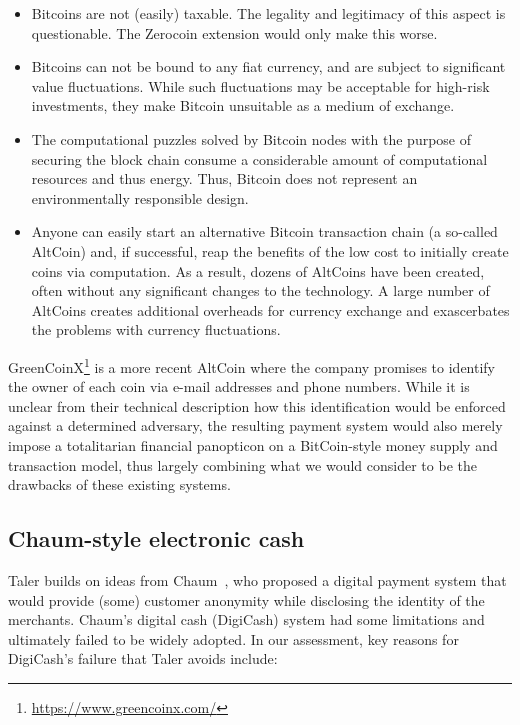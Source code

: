 \documentclass{llncs}
\begin{document}
\begin{itemize}
  \item Bitcoins are not (easily) taxable.  The legality and legitimacy of
    this aspect is questionable.  The Zerocoin extension would only make
    this worse.
  \item Bitcoins can not be bound to any fiat currency, and are subject to
    significant value fluctuations.  While such fluctuations may be
    acceptable for high-risk investments, they make Bitcoin unsuitable as
    a medium of exchange.
  \item The computational puzzles solved by Bitcoin nodes with the purpose
    of securing the block chain
    consume a considerable amount of computational resources and thus
    energy.  Thus, Bitcoin does not represent an environmentally responsible
    design.
  \item Anyone can easily start an alternative Bitcoin transaction chain
    (a so-called AltCoin) and, if successful, reap the benefits of the low
    cost to initially create coins via computation.  As a result, dozens of
    AltCoins have been created, often without any significant changes to the
    technology.  A large number of AltCoins creates additional overheads for
    currency exchange and exascerbates the problems with currency fluctuations.
\end{itemize}

GreenCoinX\footnote{\url{https://www.greencoinx.com/}} is a more
recent AltCoin where the company promises to identify the owner of
each coin via e-mail addresses and phone numbers.  While it is unclear
from their technical description how this identification would be
enforced against a determined adversary, the resulting payment system
would also merely impose a totalitarian financial panopticon on a
BitCoin-style money supply and transaction model, thus largely
combining what we would consider to be the drawbacks of these existing
systems.

\subsection{Chaum-style electronic cash}

Taler builds on ideas from Chaum~\cite{chaum1983blind}, who proposed a
digital payment system that would provide (some) customer anonymity
while disclosing the identity of the merchants.  Chaum's digital cash
(DigiCash) system had some limitations and ultimately failed to be widely
adopted.  In our assessment, key reasons for DigiCash's failure that
Taler avoids include:
\end{document}
